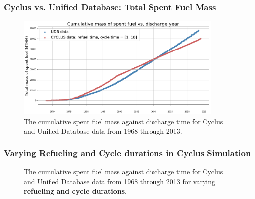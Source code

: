 \begin{frame}
    \frametitle{Cyclus vs. Unified Database: Total Spent Fuel Mass}
       
    \begin{figure}[htbp!]
      \begin{center}
        \includegraphics[height=5cm]{../figures/cumulative_mass_udb_cyclus}
      \end{center}
            \caption{The cumulative spent fuel mass against discharge time
            for Cyclus and Unified Database data from 1968 through 2013.}
      \label{fig:totalmass}
    \end{figure}
  \end{frame}

\begin{frame}
    \frametitle{Varying Refueling and Cycle durations in Cyclus Simulation}
    \begin{figure}[htbp!]
        \begin{center}
        \end{center}
        \caption{The cumulative spent fuel mass against discharge time
        for Cyclus and Unified Database data from 1968 through 2013 for varying
        \textbf{refueling and cycle durations}.}
    \end{figure}  
\end{frame}